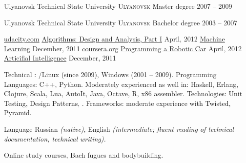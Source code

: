 \documentclass[unicode, 10pt, a4paper, oneside, fleqn]{article}
\begin{document}
\spacedhrule{0.5em}{-0.4em}

\headedsection
  {Ulyanovsk Technical State University}
  {\textsc{Ulyanovsk}} {
  \headedsubsection
    {Master degree}
    {2007 -- 2009} {
    }
  }

\headedsection
  {Ulyanovsk Technical State University}
  {\textsc{Ulyanovsk}} {
  \headedsubsection
    {Bachelor degree}
    {2003 -- 2007} {
    }
  }

\spacedhrule{0.5em}{-0.4em}

\headedsection
  {\href{http://udacity.com}{udacity.com}}
  {} {
  \headedsubsection
    {\href{https://docs.google.com/document/d/1j6LlyJUGM03TxqSImyHeHoa16dSCLZQop6zmrPe8YOw/edit}
          {Algorithms: Design and Analysis, Part I}}
    {April, 2012} {}
  \headedsubsection
    {\href{https://docs.google.com/document/d/11OT8thqIgBiwM80D_HjpiGtKTz5CnxiITPG_H6QbuUA/edit}
          {Machine Learning}}
    {December, 2011} {}
  }
\headedsection
  {\href{http://www.coursera.org}{coursera.org}}
  {} {
  \headedsubsection
    {\href{https://docs.google.com/document/d/1LpUyUwh_gGyPyKf-oxTDOy8ncQejwog1jhgMmtf59mY/edit}
          {Programming a Robotic Car}}
    {April, 2012} {}
  \headedsubsection
    {\href{https://docs.google.com/document/d/1wD_QEJ7mdzxbR_PMVEbZ_tZ0SyakJ_8Y1gBAj_S5Ufg/edit}
          {Articifial Intelligence}}
    {December, 2011} {}
  }

\spacedhrule{0.5em}{-0.4em}


\inlineheadsection  %
  {Technical}
  {: /Linux (since 2009), Windows (2001 -- 2009).
   Programming Languages: C++, Python.
   Moderately experienced as well in: Haskell, Erlang, Clojure, Scala, Lua, AutoIt,
   Java, Octave, R, x86 assembler.
   Technologies: Unit Testing, Design Patterns, .
   Frameworks: moderate experience with Twisted, Pyramid.
  }

\inlineheadsection
  {Language}
  {Russian \emph{(native)}, English \emph{(intermediate; fluent reading of
   technical documentation, technical writing).}}

\spacedhrule{1.6em}{-0.4em}


\inlineheadsection
  {}
  {Online study courses, Bach fugues and bodybuilding.}
\end{document}
